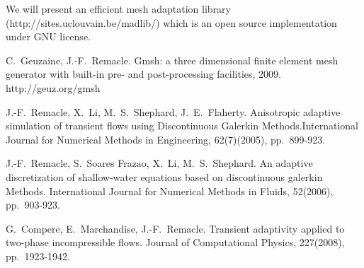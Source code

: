We will present an efficient mesh adaptation library (http://sites.uclouvain.be/madlib/) which is an open source implementation under GNU license. 


\begin{thebibliography}{10}
{\sc C.~Geuzaine, J.-F.~Remacle}. 
\newblock Gmsh: a three dimensional finite element mesh generator with built-in pre- and post-processing facilities, 2009.
\newblock http://geuz.org/gmsh

{\sc J.-F.~Remacle, X.~Li, M.~S.~Shephard, J.~E.~Flaherty}. 
\newblock Anisotropic adaptive simulation of transient flows using Discontinuous Galerkin Methods.\newblock International Journal for Numerical Methods in Engineering, 62(7)(2005), pp.~899-923.

{\sc J.-F.~Remacle, S.~Soares Frazao, X.~Li, M.~S.~Shephard}. 
\newblock An adaptive discretization of shallow-water equations based on discontinuous galerkin Methods. 
\newblock International Journal for Numerical Methods in Fluids, 52(2006), pp.~903-923.

{\sc G.~Compere, E.~Marchandise, J.-F.~Remacle}. 
\newblock Transient adaptivity applied to two-phase incompressible flows. 
\newblock Journal of Computational Physics, 227(2008), pp.~1923-1942.
\end{thebibliography}